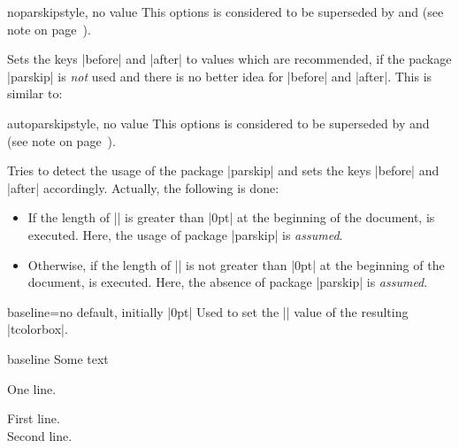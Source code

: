 \begin{docTcbKey}[][doc updated=2017-02-01]{noparskip}{}{style, no value}
  This options is considered to be superseded by
   and 
  (see note on page~\pageref{subsec:surroundings}).\par
  Sets the keys |before| and |after| to values which are
  recommended, if the package |parskip| is \emph{not} used and there is no better
  idea for |before| and |after|. This is similar to:
\begin{dispListing}
\end{dispListing}
\end{docTcbKey}

\begin{docTcbKey}{autoparskip}{}{style, no value}
  This options is considered to be superseded by
   and 
  (see note on page~\pageref{subsec:surroundings}).\par
  Tries to detect the usage of the package |parskip| and sets
  the keys |before| and |after| accordingly. Actually, the following is done:
  \begin{itemize}
  \item If the length of |\parskip| is greater than |0pt| at the beginning of the document,
     is executed. Here, the usage of package |parskip| is \emph{assumed}.
  \item Otherwise, if the length of |\parskip| is not greater than |0pt| at the beginning of the document,
     is executed. Here, the absence of package |parskip| is \emph{assumed}.
  \end{itemize}
\end{docTcbKey}


\clearpage

\begin{docTcbKey}{baseline}{=}{no default, initially |0pt|}
  Used to set the |\pgfsetbaseline| value of the resulting |tcolorbox|.
\begin{exdispExample}{baseline}
Some text\dotfill
\begin{tcolorbox}[baseline=3mm]
One line.
\end{tcolorbox}
\begin{tcolorbox}[baseline=3mm]
First line.\\Second line.
\end{tcolorbox}
\end{exdispExample}
\end{docTcbKey}


